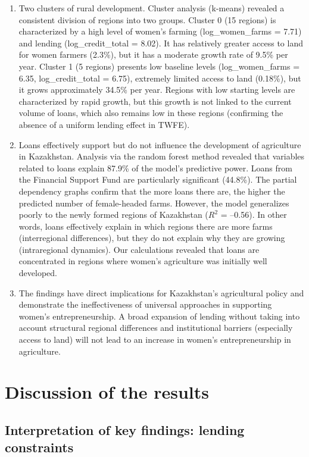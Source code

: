 ﻿\documentclass[pdflatex,sn-mathphys-ay]{sn-jnl}
\begin{document}
\begin{enumerate}
\item Two clusters of rural development.
Cluster analysis (k-means) revealed a consistent division of regions
into two groups. Cluster 0 (15 regions) is characterized by a high
level of women's farming (log\_women\_farms = 7.71) and lending
(log\_credit\_total = 8.02). It has relatively greater access to land
for women farmers (2.3\%), but it has a moderate growth rate of 9.5\%
per year. Cluster 1 (5 regions) presents low baseline levels
(log\_women\_farms = 6.35, log\_credit\_total = 6.75), extremely
limited access to land (0.18\%), but it grows approximately 34.5\% per
year. Regions with low starting levels are characterized by rapid
growth, but this growth is not linked to the current volume of loans,
which also remains low in these regions (confirming the absence of a
uniform lending effect in TWFE).

\item Loans effectively support but do not influence the development of
agriculture in Kazakhstan. Analysis via the random forest method
revealed that variables related to loans explain 87.9\% of the model's
predictive power. Loans from the Financial Support Fund are particularly
significant (44.8\%). The partial dependency graphs confirm that the
more loans there are, the higher the predicted number of female-headed
farms. However, the model generalizes poorly to the newly formed regions
of Kazakhstan ($R^2$ = --0.56). In other words, loans effectively explain
in which regions there are more farms (interregional differences), but
they do not explain why they are growing (intraregional dynamics). Our
calculations revealed that loans are concentrated in regions where
women's agriculture was initially well developed.

\item The findings have direct implications for Kazakhstan's
agricultural policy and demonstrate the ineffectiveness of universal
approaches in supporting women's entrepreneurship. A broad expansion of
lending without taking into account structural regional differences and
institutional barriers (especially access to land) will not lead to an
increase in women's entrepreneurship in agriculture.
\end{enumerate}

\section{Discussion of the results}

\subsection{Interpretation of key findings: lending constraints}
\end{document}
